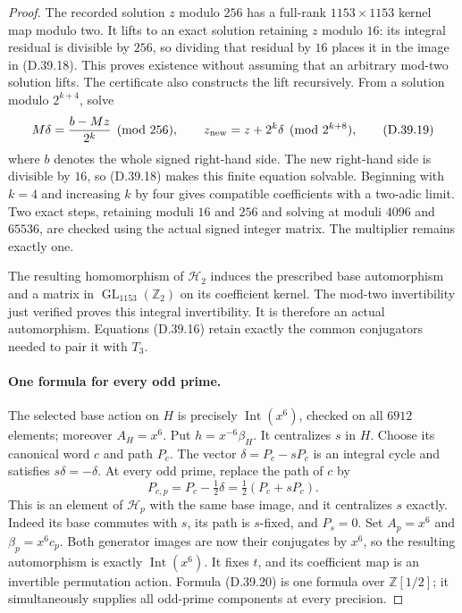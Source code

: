 \begin{proof}
The recorded solution $z$ modulo $256$ has a full-rank
$1153\times1153$ kernel map modulo two. It lifts to an
exact solution retaining $z$ modulo $16$: its integral
residual is divisible by $256$, so dividing that residual
by $16$ places it in the image in (D.39.18). This proves
existence without assuming that an arbitrary mod-two
solution lifts. The certificate also constructs the lift
recursively. From a solution modulo $2^{k+4}$, solve
\[
 M\delta=\frac{b-Mz}{2^k}\pmod{256},\qquad
 z_{\rm new}=z+2^k\delta\pmod{2^{k+8}},                    \tag{D.39.19}
\]
where $b$ denotes the whole signed right-hand side.
The new right-hand side is divisible by $16$, so
(D.39.18) makes this finite equation solvable. Beginning
with $k=4$ and increasing $k$ by four gives compatible
coefficients with a two-adic limit. Two exact steps,
retaining moduli $16$ and $256$ and solving at moduli
$4096$ and $65536$, are checked using the actual signed
integer matrix. The multiplier remains exactly one.

The resulting homomorphism of $\mathcal H_2$ induces
the prescribed base automorphism and a matrix in
$\operatorname{GL}_{1153}(\mathbb Z_2)$ on its coefficient
kernel. The mod-two invertibility just verified proves
this integral invertibility. It is therefore an actual
automorphism. Equations (D.39.16) retain exactly the
common conjugators needed to pair it with $T_3$.

\paragraph{One formula for every odd prime.}
The selected base action on $H$ is precisely
$\operatorname{Int}(x^6)$, checked on all $6912$ elements;
moreover $A_H=x^6$. Put $h=x^{-6}\beta_H$. It centralizes
$s$ in $H$. Choose its canonical word $c$ and path $P_c$.
The vector $\delta=P_c-sP_c$ is an integral cycle and
satisfies $s\delta=-\delta$. At every odd prime, replace
the path of $c$ by
\[
 P_{c,p}=P_c-\tfrac12\delta
          =\tfrac12(P_c+sP_c).                            \tag{D.39.20}
\]
This is an element of $\mathcal H_p$ with the same base
image, and it centralizes $s$ exactly. Indeed its base
commutes with $s$, its path is $s$-fixed, and $P_s=0$.
Set $A_p=x^6$ and $\beta_p=x^6c_p$. Both generator images
are now their conjugates by $x^6$, so the resulting
automorphism is exactly $\operatorname{Int}(x^6)$.
It fixes $t$, and its coefficient map is an invertible
permutation action. Formula (D.39.20) is one formula
over $\mathbb Z[1/2]$; it simultaneously supplies all
odd-prime components at every precision.


\end{proof}
